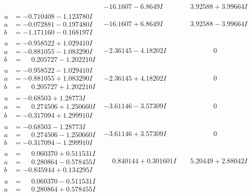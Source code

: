 \documentclass[1p]{elsarticle_modified}
\theoremstyle{definition}
\begin{document}
$$\begin{array}{c|c|c}
 & -16.1607 - 6.8649 I & \phantom{-}3.92588 + 3.99664 I \\ \hline\begin{aligned}
u &= -0.710408 - 1.123780 I \\
a &= -0.072881 - 0.197480 I \\
b &= -1.171160 - 0.168197 I\end{aligned}
 & -16.1607 + 6.8649 I & \phantom{-}3.92588 - 3.99664 I \\ \hline\begin{aligned}
u &= -0.958522 + 1.029410 I \\
a &= -0.881055 - 1.083290 I \\
b &= \phantom{-}0.205727 - 1.202210 I\end{aligned}
 & -2.36145 - 4.18202 I & \phantom{-0.000000 } 0 \\ \hline\begin{aligned}
u &= -0.958522 - 1.029410 I \\
a &= -0.881055 + 1.083290 I \\
b &= \phantom{-}0.205727 + 1.202210 I\end{aligned}
 & -2.36145 + 4.18202 I & \phantom{-0.000000 } 0 \\ \hline\begin{aligned}
u &= -0.68503 + 1.28773 I \\
a &= \phantom{-}0.274506 + 1.250660 I \\
b &= -0.317094 + 1.299910 I\end{aligned}
 & -3.61146 - 3.57309 I & \phantom{-0.000000 } 0 \\ \hline\begin{aligned}
u &= -0.68503 - 1.28773 I \\
a &= \phantom{-}0.274506 - 1.250660 I \\
b &= -0.317094 - 1.299910 I\end{aligned}
 & -3.61146 + 3.57309 I & \phantom{-0.000000 } 0 \\ \hline\begin{aligned}
u &= \phantom{-}0.060370 + 0.511531 I \\
a &= \phantom{-}0.280864 - 0.578455 I \\
b &= -0.835944 + 0.134295 I\end{aligned}
 & \phantom{-}0.840144 + 0.301601 I & \phantom{-}5.20449 + 2.88042 I \\ \hline\begin{aligned}
u &= \phantom{-}0.060370 - 0.511531 I \\
a &= \phantom{-}0.280864 + 0.578455 I \\

\end{aligned}
\end{array}$$
\end{document}
